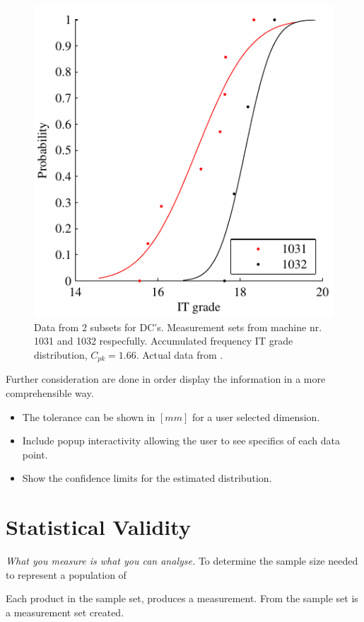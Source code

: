 \documentclass[aip,amsmath, reprint, author-year]{revtex4-1}
\begin{document}
\begin{figure}
\includegraphics{Acum_freqF3.pdf}
\caption{\label{fig:acumfreqF3} Data from 2 subsets for DC's. Measurement sets from machine nr. 1031 and 1032 respecfully. Accumulated frequency IT grade distribution, $C_{pk} =1.66$. Actual data from \cite{thornton2000use}. }
\end{figure}

Further consideration are done in order display the information in a more comprehensible way.
\begin{itemize}
\item The tolerance can be shown in $[mm]$ for a user selected dimension.
\item Include popup interactivity allowing the user to see specifics of each data point.
\item Show the confidence limits for the estimated distribution.
\end{itemize}

\section{Statistical Validity}

\emph{What you measure is what you can analyse.}  
To determine the sample size needed to represent a population of 


Each product in the sample set, produces a measurement. From the sample set is a  measurement set created. 
\end{document}
